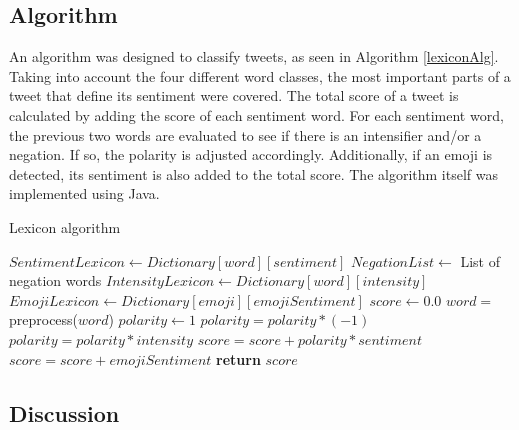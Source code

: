 \subsection{Algorithm}

An algorithm was designed to classify tweets, as seen in Algorithm \ref{lexiconAlg}. Taking into account the four different word classes, the most important parts of a tweet that define its sentiment were covered. The total score of a tweet is calculated by adding the score of each sentiment word. For each sentiment word, the previous two words are evaluated to see if there is an intensifier and/or a negation. If so, the polarity is adjusted accordingly. Additionally, if an emoji is detected, its sentiment is also added to the total score. The algorithm itself was implemented using Java.

\begin{algorithm}[]
  \caption{Lexicon algorithm}\label{lexiconAlg}
    \begin{algorithmic}[1]
            \State $SentimentLexicon \gets Dictionary[word][sentiment]$
            \State $NegationList \gets$ List of negation words
            \State $IntensityLexicon \gets Dictionary[word][intensity]$
            \State $EmojiLexicon \gets Dictionary[emoji][emojiSentiment]$ 
            \State $score \gets 0.0$
                \State $word =$ preprocess($word$)
                    \State $polarity \gets 1$
                            \State $polarity = polarity * (-1)$
                        \Else
                                \State $polarity = polarity * intensity$
                            \EndIf
                        \EndIf
                    \EndFor
                    \State $score = score + polarity * sentiment$
                \Else
                        \State $score = score + emojiSentiment$
                    \EndIf
                \EndIf 
            \EndFor
            \State \textbf{return} $score$
        \EndFunction
    \end{algorithmic}
\end{algorithm}

\subsection{Discussion}
